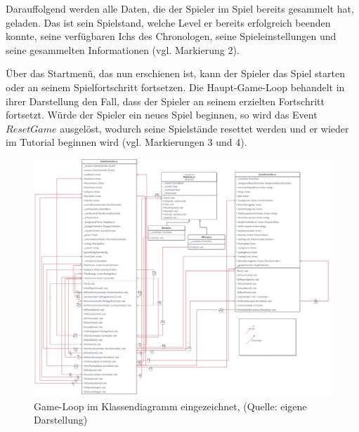 Darauffolgend werden alle Daten, die der Spieler im Spiel bereits gesammelt hat, geladen. Das ist sein Spielstand, welche Level er bereits erfolgreich beenden konnte, seine verfügbaren Ichs des Chronologen, seine Spieleinstellungen und seine gesammelten Informationen (vgl. Markierung 2). 

Über das Startmenü, das nun erschienen ist, kann der Spieler das Spiel starten oder an seinem Spielfortschritt fortsetzen. Die Haupt-Game-Loop behandelt in ihrer Darstellung den Fall, dass der Spieler an seinem erzielten Fortschritt fortsetzt. Würde der Spieler ein neues Spiel beginnen, so wird das Event $ResetGame$ ausgelöst, wodurch seine Spielstände resettet werden und er wieder im Tutorial beginnen wird (vgl. Markierungen 3 und 4).

\begin{figure}[ht]
\centering
\includegraphics[width=1\linewidth]{content/pictures/Game-Loop-Class-Diagramm-Connectors.jpg}
\caption{Game-Loop im Klassendiagramm eingezeichnet, (Quelle: eigene Darstellung)}
\label{fig:main_game_loop_class_connectors}
\end{figure}

